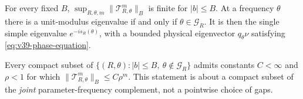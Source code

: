 \begin{theorem}
\label{thm:v40-full-peripheral}
For every fixed $B$, $\sup_{R,\theta,m}\|\mathscr T_{R,\theta}^m\|_B$
is finite for $|b|\le B$. At a frequency $\theta$ there is a
unit-modulus eigenvalue if and only if $\theta\in\mathcal G_R$.
It is then the single simple eigenvalue $e^{-is_R(\theta)}$, with a
bounded physical eigenvector $q_\theta\nu$ satisfying
\eqref{eq:v39-phase-equation}.

Every compact subset of
$\{(R,\theta):|b|\le B,\ \theta\notin\mathcal G_R\}$ admits
constants $C<\infty$ and $\rho<1$ for which
$\|\mathscr T_{R,\theta}^m\|_B\le C\rho^m$.
This statement is about a compact subset of the \emph{joint}
parameter-frequency complement, not a pointwise choice of gaps.
\end{theorem}
